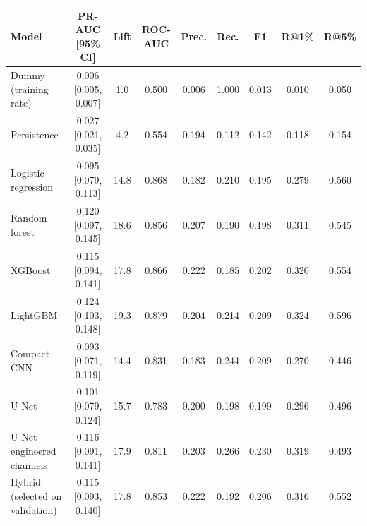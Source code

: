 \begin{tabular}{lcccccccc}
\toprule
Model & PR-AUC [95\% CI] & Lift & ROC-AUC & Prec. & Rec. & F1 & R@1\% & R@5\% \\
\midrule
Dummy (training rate) & 0.006 [0.005, 0.007] & 1.0 & 0.500 & 0.006 & 1.000 & 0.013 & 0.010 & 0.050 \\
Persistence & 0.027 [0.021, 0.035] & 4.2 & 0.554 & 0.194 & 0.112 & 0.142 & 0.118 & 0.154 \\
Logistic regression & 0.095 [0.079, 0.113] & 14.8 & 0.868 & 0.182 & 0.210 & 0.195 & 0.279 & 0.560 \\
Random forest & 0.120 [0.097, 0.145] & 18.6 & 0.856 & 0.207 & 0.190 & 0.198 & 0.311 & 0.545 \\
XGBoost & 0.115 [0.094, 0.141] & 17.8 & 0.866 & 0.222 & 0.185 & 0.202 & 0.320 & 0.554 \\
LightGBM & 0.124 [0.103, 0.148] & 19.3 & 0.879 & 0.204 & 0.214 & 0.209 & 0.324 & 0.596 \\
Compact CNN & 0.093 [0.071, 0.119] & 14.4 & 0.831 & 0.183 & 0.244 & 0.209 & 0.270 & 0.446 \\
U-Net & 0.101 [0.079, 0.124] & 15.7 & 0.783 & 0.200 & 0.198 & 0.199 & 0.296 & 0.496 \\
U-Net + engineered channels & 0.116 [0.091, 0.141] & 17.9 & 0.811 & 0.203 & 0.266 & 0.230 & 0.319 & 0.493 \\
Hybrid (selected on validation) & 0.115 [0.093, 0.140] & 17.8 & 0.853 & 0.222 & 0.192 & 0.206 & 0.316 & 0.552 \\
\bottomrule
\end{tabular}
